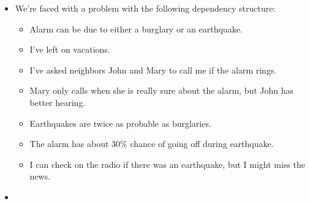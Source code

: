 \documentclass{beamer}
\begin{document}
\begin{itemize}
  \item We're faced with a problem with the following dependency structure:
  
  \begin{itemize}
    \item Alarm can be due to either a burglary or an earthquake.
    
    \item I've left on vacations.
    
    \item I've asked neighbors John and Mary to call me if the alarm rings.
    
    \item Mary only calls when she is really sure about the alarm, but John
    has better hearing.
    
    \item Earthquakes are twice as probable as burglaries.
    
    \item The alarm has about 30\% chance of going off during earthquake.
    
    \item I can check on the radio if there was an earthquake, but I might
    miss the news.
  \end{itemize}
  \item {}{}{\hlopt{(}}{}{\hlopt{:
  }}{}{\hlopt{) =
  }}{}{\hlendline{}}\\
  {\hlstd{ \ }}{}{}{\hlendline{}}\\
  {\hlstd{ \ }}{}{}{\hlopt{=}}{\hlendline{}}\\
  {\hlstd{ \ \ \ }}{}{\hlopt{\textbar }}{}{\hlopt{\textbar }}{}{\hlopt{\textbar
  }}{}{\hlendline{}}
  

\end{itemize}
\end{document}
